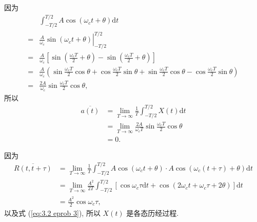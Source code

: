 \begin{exampleprob}[各态历经性的判断]
\begin{solution}
        因为
        \begin{equation*}
            \begin{aligned}
                  & \int_{-T/2}^{T/2}A\cos(\omega_ct+\theta)\mathrm{d}t                                                                                                                    \\
                = & \left.\frac{A}{\omega_c}\sin(\omega_ct+\theta)\right|_{-T/2}^{T/2}                                                                                                     \\
                = & \frac{A}{\omega_c}\left[\sin\left(\frac{\omega_cT}{2}+\theta\right)-\sin\left(\frac{\omega_cT}{2}+\theta\right)\right]                                                 \\
                = & \frac{A}{\omega_c}\left(\sin\frac{\omega_cT}{2}\cos\theta+\cos\frac{\omega_cT}{2}\sin\theta+\sin\frac{\omega_cT}{2}\cos\theta-\cos\frac{\omega_cT}{2}\sin\theta\right) \\
                = & \frac{2A}{\omega_c}\sin\frac{\omega_cT}{2}\cos\theta,
            \end{aligned}
        \end{equation*}
        所以
        \begin{equation} \label{eq:3.2 eprob 3}
            \begin{aligned}
                \overline{a(t)} & =\lim_{T\rightarrow\infty}\frac{1}{T}\int_{-T/2}^{T/2}X(t)\mathrm{d}t           \\
                                & =\lim_{T\rightarrow\infty}\frac{2A}{\omega_cT}\sin\frac{\omega_cT}{2}\cos\theta \\
                                & =0.
            \end{aligned}
        \end{equation}

        因为
        \begin{equation*}
            \begin{aligned}
                \overline{R(t,t+\tau)} & =\lim_{T\rightarrow\infty}\frac{1}{T}\int_{-T/2}^{T/2}A\cos(\omega_ct+\theta)\cdot A\cos(\omega_c(t+\tau)+\theta)\mathrm{d}t            \\
                                       & =\lim_{T\rightarrow\infty}\frac{A^2}{2T}\int_{-T/2}^{T/2}[\cos\omega_c\tau\mathrm{d}t+\cos(2\omega_ct+\omega_c\tau+2\theta)]\mathrm{d}t \\
                                       & =\frac{A^2}{2}\cos\omega_c\tau,
            \end{aligned}
        \end{equation*}
        以及式 (\ref{eq:3.2 eprob 3}), 所以 $X(t)$ 是各态历经过程.
    \end{solution}
\end{exampleprob}

